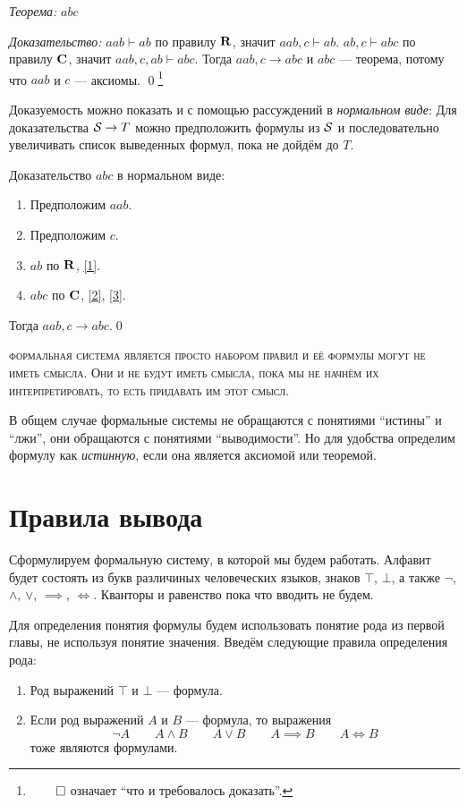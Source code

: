 {\it Теорема:} $abc$

{\it Доказательство:}
$aab\vdash ab$ по правилу $\mathbf{R}$, значит $aab,c\vdash ab$.
$ab,c\vdash abc$ по правилу $\mathbf{C}$, значит $aab,c,ab\vdash abc$.
Тогда $aab,c\to abc$ и $abc$ --- теорема, потому что $aab$ и $c$ --- аксиомы.
\qed\footnote{$\qed$ означает ``что и требовалось доказать''.}

Доказуемость можно показать и с помощью рассуждений в {\it нормальном виде}:
Для доказательства $\mathcal S\to T$ можно предположить формулы из $\mathcal S$ и последовательно
увеличивать список выведенных формул, пока не дойдём до $T$.

\pagebreak

Доказательство $abc$ в нормальном виде:
\begin{enumerate}[label=(\arabic*)]
	\item{}\label{1}Предположим $aab$.
	\item{}\label{2}Предположим $c$.
	\item{}\label{3}$ab$ по $\mathbf{R}$, \ref{1}.
	\item{}\label{4}$abc$ по $\mathbf{C}$, \ref{2}, \ref{3}.
\end{enumerate}

Тогда $aab,c\to abc$.\qed

\textsc{формальная система является просто набором правил и её формулы
	могут не иметь смысла. Они и не будут иметь смысла, пока мы не начнём их
	интерпретировать, то есть придавать им этот смысл.}

В общем случае формальные системы не обращаются с понятиями ``истины'' и ``лжи'',
они обращаются с понятиями ``выводимости''. Но для удобства определим формулу
как {\it истинную}, если она является аксиомой или теоремой.

\section{Правила вывода}

Сформулируем формальную систему, в которой мы будем работать.
Алфавит будет состоять из букв различиных человеческих языков, знаков $\top$,
$\bot$, а также $\lnot$, $\land$, $\lor$, $\implies$, $\iff$. Кванторы и равенство пока
что вводить не будем.

Для определения понятия формулы будем использовать понятие рода из первой главы,
не используя понятие значения.
Введём следующие правила определения рода:
\begin{enumerate}
	\item{}Род выражений $\top$ и $\bot$ --- формула.
	\item{}Если род выражений $A$ и $B$ --- формула, то выражения
	\[
		\lnot A\qquad A\land B\qquad A\lor B\qquad A\implies B\qquad A\iff B
	\]
	тоже являются формулами.
\end{enumerate}

